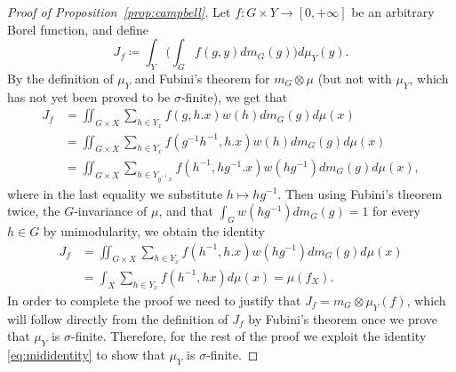 \documentclass{amsart}
\numberwithin{equation}{subsection}
\theoremstyle{remark}
\begin{document}
\begin{proof}[Proof of Proposition~\ref{prop:campbell}]
Let \(f:G\times Y\to\left[0,+\infty\right]\) be an arbitrary Borel function, and define
\[J_{f}\coloneqq\int_{Y}\Big(\int_{G}f\left(g,y\right)dm_{G}\left(g\right)\Big)d\mu_{Y}\left(y\right).\]
By the definition of \(\mu_{Y}\) and Fubini's theorem for \(m_{G}\otimes\mu\) (but not with \(\mu_{Y}\), which has not yet been proved to be \(\sigma\)-finite), we get that
\begin{align*}
J_{f}
&=\iint\nolimits_{G\times X}\sum\nolimits_{h\in Y_{x}}f\left(g,h.x\right)w\left(h\right)dm_{G}\left(g\right)d\mu\left(x\right)\\
&=\iint\nolimits_{G\times X}\sum\nolimits_{h\in Y_{x}}f\left(g^{-1}h^{-1},h.x\right)w\left(h\right)dm_{G}\left(g\right)d\mu\left(x\right)\\
&=\iint\nolimits_{G\times X}\sum\nolimits_{h\in Y_{g^{-1}.x}}f\left(h^{-1},hg^{-1}.x\right)w\left(hg^{-1}\right)dm_{G}\left(g\right)d\mu\left(x\right),
\end{align*}
where in the last equality we substitute \(h\mapsto hg^{-1}\). Then using Fubini's theorem twice, the \(G\)-invariance of \(\mu\), and that \(\int_{G}w\left(hg^{-1}\right)dm_{G}\left(g\right)=1\) for every \(h\in G\) by unimodularity, we obtain the identity
\begin{equation}\label{eq:mididentity}
\begin{aligned}
J_{f}
&=\iint\nolimits_{G\times X}\sum\nolimits_{h\in Y_{x}}f\left(h^{-1},h.x\right)w\left(hg^{-1}\right)dm_{G}\left(g\right)d\mu\left(x\right)\\
&=\int\nolimits_{X}\sum\nolimits_{h\in Y_{x}}f\left(h^{-1},hx\right)d\mu\left(x\right)=\mu\left(f_{X}\right).
\end{aligned}
\end{equation}
In order to complete the proof we need to justify that \(J_{f}=m_{G}\otimes\mu_{Y}\left(f\right)\), which will follow directly from the definition of \(J_{f}\) by Fubini's theorem once we prove that \(\mu_{Y}\) is \(\sigma\)-finite. Therefore, for the rest of the proof we exploit the identity \eqref{eq:mididentity} to show that \(\mu_{Y}\) is \(\sigma\)-finite.


\end{proof}
\end{document}
